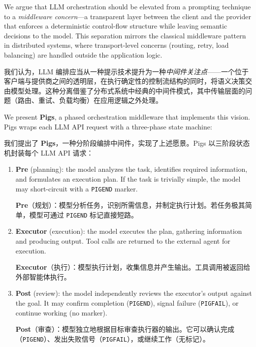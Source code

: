 We argue that LLM orchestration should be elevated from a prompting technique to a \emph{middleware concern}---a transparent layer between the client and the provider that enforces a deterministic control-flow structure while leaving semantic decisions to the model. This separation mirrors the classical middleware pattern in distributed systems, where transport-level concerns (routing, retry, load balancing) are handled outside the application logic.
\begin{chinese}
我们认为，LLM 编排应当从一种提示技术提升为一种\emph{中间件关注点}——一个位于客户端与提供商之间的透明层，在执行确定性的控制流结构的同时，将语义决策交由模型处理。这种分离借鉴了分布式系统中经典的中间件模式，其中传输层面的问题（路由、重试、负载均衡）在应用逻辑之外处理。
\end{chinese}

We present \textbf{Pigs}, a phased orchestration middleware that implements this vision. Pigs wraps each LLM API request with a three-phase state machine:
\begin{chinese}
我们提出了 \textbf{Pigs}，一种分阶段编排中间件，实现了上述愿景。Pigs 以三阶段状态机封装每个 LLM API 请求：
\end{chinese}

\begin{enumerate}[nosep]
    \item \textbf{Pre} (planning): the model analyzes the task, identifies required information, and formulates an execution plan. If the task is trivially simple, the model may short-circuit with a \texttt{PIGEND} marker.
    \begin{chinese}
    \textbf{Pre}（规划）：模型分析任务，识别所需信息，并制定执行计划。若任务极其简单，模型可通过 \texttt{PIGEND} 标记直接短路。
    \end{chinese}
    \item \textbf{Executor} (execution): the model executes the plan, gathering information and producing output. Tool calls are returned to the external agent for execution.
    \begin{chinese}
    \textbf{Executor}（执行）：模型执行计划，收集信息并产生输出。工具调用被返回给外部智能体执行。
    \end{chinese}
    \item \textbf{Post} (review): the model independently reviews the executor's output against the goal. It may confirm completion (\texttt{PIGEND}), signal failure (\texttt{PIGFAIL}), or continue working (no marker).
    \begin{chinese}
    \textbf{Post}（审查）：模型独立地根据目标审查执行器的输出。它可以确认完成（\texttt{PIGEND}）、发出失败信号（\texttt{PIGFAIL}），或继续工作（无标记）。
    \end{chinese}
\end{enumerate}

